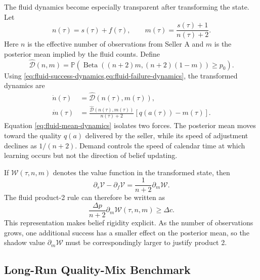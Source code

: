 \documentclass[opre]{informs3}
\newcommand{\Pb}{\mathbb{P}}
\begin{document}
The fluid dynamics become especially transparent after transforming the state.
Let
\begin{equation}
    n(\tau)=s(\tau)+f(\tau),
    \qquad
    m(\tau)=\frac{s(\tau)+1}{n(\tau)+2}.
    \label{eq:fluid-state-transform}
\end{equation}
Here $n$ is the effective number of observations from Seller A and $m$ is the
posterior mean implied by the fluid counts. Define
\begin{equation}
    \widehat{\mathcal{D}}(n,m)
    =
    \Pb\left(
        \operatorname{Beta}((n+2)m,(n+2)(1-m))\geq p_0
    \right).
    \label{eq:fluid-demand-nm}
\end{equation}
Using \cref{eq:fluid-success-dynamics,eq:fluid-failure-dynamics}, the transformed
dynamics are
\begin{align}
    \dot{n}(\tau)
    &=
    \widehat{\mathcal{D}}(n(\tau),m(\tau)),
    \label{eq:fluid-count-dynamics}\\
    \dot{m}(\tau)
    &=
    \frac{\widehat{\mathcal{D}}(n(\tau),m(\tau))}{n(\tau)+2}
    [q(a(\tau))-m(\tau)].
    \label{eq:fluid-mean-dynamics}
\end{align}
Equation \eqref{eq:fluid-mean-dynamics} isolates two forces. The posterior mean
moves toward the quality $q(a)$ delivered by the seller, while its speed of
adjustment declines as $1/(n+2)$. Demand controls the speed of calendar time at
which learning occurs but not the direction of belief updating.

If $\mathcal{W}(\tau,n,m)$ denotes the value function in the transformed state,
then
\begin{equation}
    \partial_s\mathcal{V}-\partial_f\mathcal{V}
    =
    \frac{1}{n+2}\partial_m\mathcal{W}.
    \label{eq:fluid-shadow-transform}
\end{equation}
The fluid product-2 rule can therefore be written as
\begin{equation}
    \frac{\Delta p}{n+2}\partial_m\mathcal{W}(\tau,n,m)
    \geq \Delta c.
    \label{eq:fluid-mean-threshold}
\end{equation}
This representation makes belief rigidity explicit. As the number of
observations grows, one additional success has a smaller effect on the posterior
mean, so the shadow value $\partial_m\mathcal{W}$ must be correspondingly larger
to justify product 2.

\subsection{Long-Run Quality-Mix Benchmark}
\end{document}
